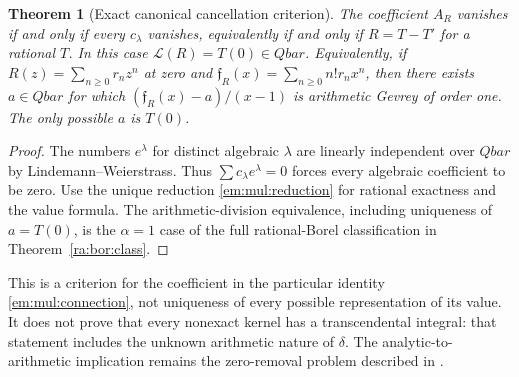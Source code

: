 \documentclass[11pt,a4paper]{article}
\newcommand{\QB}{\overline{\mathbb Q}}
\newcommand{\Qbar}{\overline{\mathbb Q}}
\newtheorem{theorem}{Theorem}[section]
\theoremstyle{definition}
\theoremstyle{remark}
\theoremstyle{plain}
\numberwithin{equation}{section}
\def\Qbar{Qbar}\def\QB{Qbar}\def\mathbb#1{#1}%
\begin{document}
\begin{theorem}[Exact canonical cancellation criterion]\label{em:mul:cancellation}
The coefficient $A_R$ vanishes if and only if every $c_\lambda$ vanishes,
equivalently if and only if $R=T-T'$ for a rational $T$.  In this case
$\mathcal L(R)=T(0)\in\Qbar$.
Equivalently, if $R(z)=\sum_{n\ge0}r_nz^n$ at zero and
$\mathfrak f_R(x)=\sum_{n\ge0}n!r_nx^n$, then there exists
$a\in\Qbar$ for which
$(\mathfrak f_R(x)-a)/(x-1)$ is arithmetic Gevrey of order one.
The only possible $a$ is $T(0)$.
\end{theorem}
\begin{proof}
The numbers $e^\lambda$ for distinct algebraic $\lambda$ are linearly
independent over $\Qbar$ by Lindemann--Weierstrass.  Thus
$\sum c_\lambda e^\lambda=0$ forces every algebraic coefficient to be zero.
Use the unique reduction \eqref{em:mul:reduction} for rational exactness
and the value formula. The arithmetic-division equivalence, including
uniqueness of $a=T(0)$, is the $\alpha=1$ case of the full rational-Borel
classification in Theorem~\ref{ra:bor:class}.
\end{proof}
This is a criterion for the coefficient in the particular identity
\eqref{em:mul:connection}, not uniqueness of every possible representation
of its value.  It does not prove that every nonexact kernel has a
transcendental integral: that statement includes the unknown arithmetic
nature of $\delta$.  The analytic-to-arithmetic implication remains the
zero-removal problem described in \cite{FRmixed}.
\end{document}
